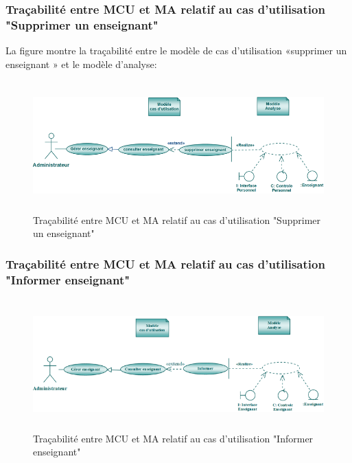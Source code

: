 \documentclass[12 pt]{report}
\begin{document}
\subsubsection{Traçabilité entre MCU et MA relatif au cas d’utilisation "Supprimer un enseignant" }
La figure  montre la traçabilité entre le modèle de cas d’utilisation «supprimer un enseignant » et le modèle
d’analyse:
\begin{figure}[h]
\begin{center}
\includegraphics[width= 13cm , height =5cm]{sup_ens.png}
\caption{Traçabilité entre MCU et MA relatif au cas d’utilisation "Supprimer un enseignant"}
\end{center}
\end{figure} 
\subsubsection{Traçabilité entre MCU et MA relatif au cas d’utilisation "Informer enseignant" }
\begin{figure}[h]
\begin{center}
\includegraphics[width= 13cm , height =5cm]{tra_info_ens.png}
\caption{Traçabilité entre MCU et MA relatif au cas d’utilisation "Informer enseignant"}
\end{center}
\end{figure}
\end{document}
